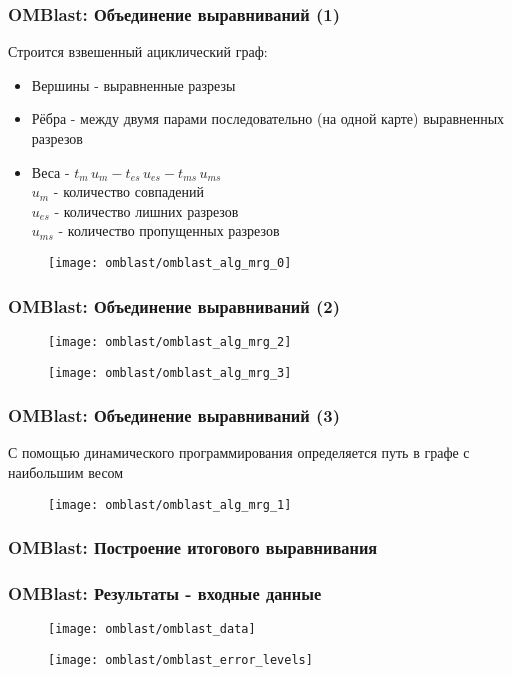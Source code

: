 \begin{frame}
\frametitle{OMBlast: Объединение выравниваний (1)}
  Строится взвешенный ациклический граф:
  \begin{itemize}
    \item Вершины - выравненные разрезы
    \item Рёбра - между двумя парами последовательно (на одной карте) выравненных разрезов
    \item Веса - $t_m \, u_m - t_{es} \, u_{es} - t_{ms} \, u_{ms}$ \\
    $u_{m}$ - количество совпадений\\
    $u_{es}$ - количество лишних разрезов\\
    $u_{ms}$ - количество пропущенных разрезов
  \end{itemize}
  \begin{figure}
    \centering
    \texttt{[image: omblast/omblast\_alg\_mrg\_0]}
  \end{figure}
\end{frame}

\begin{frame}
\frametitle{OMBlast: Объединение выравниваний (2)}
  \begin{figure}
    \centering
    \texttt{[image: omblast/omblast\_alg\_mrg\_2]}
  \end{figure}
  \begin{figure}
    \centering
    \texttt{[image: omblast/omblast\_alg\_mrg\_3]}
  \end{figure}

\end{frame}

\begin{frame}
\frametitle{OMBlast: Объединение выравниваний (3)}
С помощью динамического программирования определяется путь в графе с наибольшим весом
  \begin{figure}
    \centering
    \texttt{[image: omblast/omblast\_alg\_mrg\_1]}
  \end{figure}

\end{frame}


\begin{frame}
\frametitle{OMBlast: Построение итогового выравнивания}


\end{frame}

\begin{frame}
\frametitle{OMBlast: Результаты - входные данные}
  \begin{figure}
    \centering
    \texttt{[image: omblast/omblast\_data]}
  \end{figure}
  \begin{figure}
    \centering
    \texttt{[image: omblast/omblast\_error\_levels]}
  \end{figure}
\end{frame}

